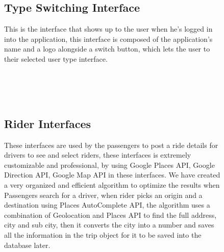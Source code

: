 \begin{figure}
\hspace*{\fill}
\hfill 
{}
\hspace*{\fill}
\end{figure}

\begin{figure}
\centering
{}
\end{figure}

\begin{figure}
\subsection{Type Switching Interface}
This is the interface that shows up to the user when he’s logged in into the application, this interface is composed of the application’s name and a logo alongside a switch button, which lets the user to their selected user type interface.\\~\\
\begin{center}
\\~\\
\end{center}
\subsection{Rider Interfaces}
These interfaces are used by the passengers to post a ride details for drivers to see and select riders, these interfaces is extremely customizable and professional, by using Google Places API, Google Direction API, Google Map API in these interfaces. We have created a very organized and efficient algorithm to optimize the results when Passengers search for a driver, when rider picks an origin and a destination using Places AutoComplete API, the algorithm uses a combination of Geolocation and Places API to find the full address, city and sub city, then it converts the city into a number and saves all the information in the trip object for it to be saved into the database later.
\end{figure}

\begin{figure} 
\hspace*{\fill}
\hfill 
{}
\hspace*{\fill}
\end{figure}

